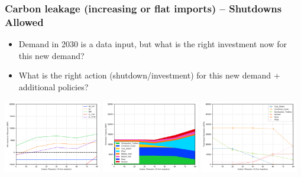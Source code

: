 \documentclass[xcolor=dvipsnames]{beamer}
\begin{document}
\begin{frame}
  \frametitle{Carbon leakage (increasing or flat imports) -- Shutdowns Allowed}
\begin{itemize}
  \item Demand in 2030 is a data input, but what is the right investment now for this new demand?
  \item What is the right action (shutdown/investment) for this new
    demand + additional policies?
\end{itemize}


  \includegraphics[width=0.32\textwidth]{includes/leakage_shutdowns_agg_exim.png}
  \includegraphics[width=0.32\textwidth]{includes/leakage_shutdowns_agg_capacity_cntlreg.png}
  \includegraphics[width=0.32\textwidth]{includes/leakage_shutdowns_agg_generation_cntlreg.png}


\end{frame}
\end{document}
